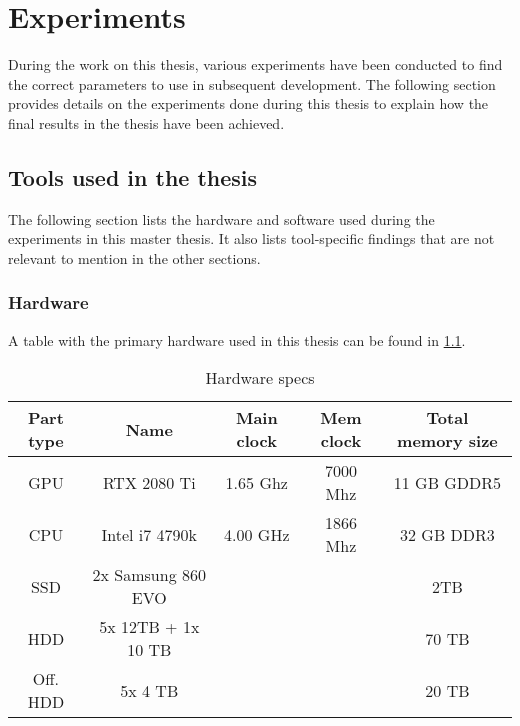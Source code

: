 \chapter{Experiments}

During the work on this thesis, various experiments have been conducted to find the correct parameters to use in subsequent development.
The following section provides details on the experiments done during this thesis to explain how the final results in the thesis have been achieved.


\section{Tools used in the thesis}
The following section lists the hardware and software used during the experiments in this master thesis.
It also lists tool-specific findings that are not relevant to mention in the other sections.

\subsection{Hardware}

A table with the primary hardware used in this thesis can be found in \cref{tab:hardware}.

\begin{table}[ht]
    \centering
    \begin{tabular}{|c|c|c|c|c|}
        \hline
        Part type & Name & Main clock & Mem clock & Total memory size\\ \hline
        GPU & RTX 2080 Ti & 1.65 Ghz & 7000 Mhz & 11 GB GDDR5\\ \hline
        CPU & Intel i7 4790k & 4.00 GHz & 1866 Mhz & 32 GB DDR3\\ \hline
        SSD & 2x Samsung 860 EVO & & & 2TB \\ \hline
        HDD & 5x 12TB + 1x 10 TB & & & 70 TB \\ \hline
        Off. HDD & 5x 4 TB & & & 20 TB \\ \hline
        
    \end{tabular}
    \caption{Hardware specs}
    \label{tab:hardware}
\end{table}

